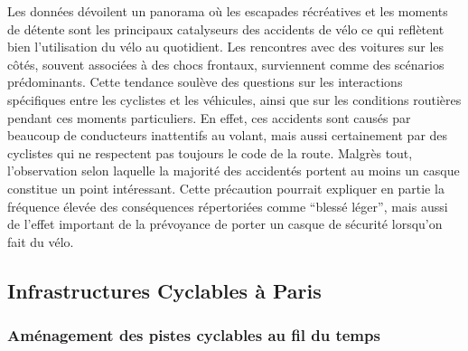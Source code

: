 \documentclass[french,]{compterendu}
\theoremstyle{urcastyle}
\theoremstyle{remark}
\begin{document}
Les données dévoilent un panorama où les escapades récréatives et les moments de détente sont les principaux catalyseurs des accidents de vélo ce qui reflètent bien l'utilisation du vélo au quotidient.
Les rencontres avec des voitures sur les côtés, souvent associées à des chocs frontaux, surviennent comme des scénarios prédominants. Cette tendance soulève des questions sur les interactions spécifiques entre les cyclistes et les véhicules, ainsi que sur les conditions routières pendant ces moments particuliers. En effet, ces accidents sont causés par beaucoup de conducteurs inattentifs au volant, mais aussi certainement par des cyclistes qui ne respectent pas toujours le code de la route.
Malgrès tout, l'observation selon laquelle la majorité des accidentés portent au moins un casque constitue un point intéressant. Cette précaution pourrait expliquer en partie la fréquence élevée des conséquences répertoriées comme ``blessé léger'', mais aussi de l'effet important de la prévoyance de porter un casque de sécurité lorsqu'on fait du vélo.

\hypertarget{infrastructures-cyclables-uxe0-paris}{%
\subsection{Infrastructures Cyclables à Paris}\label{infrastructures-cyclables-uxe0-paris}}

\hypertarget{amuxe9nagement-des-pistes-cyclables-au-fil-du-temps}{%
\subsubsection{Aménagement des pistes cyclables au fil du temps}\label{amuxe9nagement-des-pistes-cyclables-au-fil-du-temps}}
\end{document}
